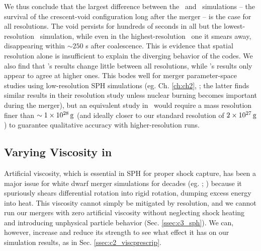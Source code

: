 
We thus conclude that the largest difference between the \gasoline\ and \arepo\ simulations -- the survival of the crescent-void configuration long after the merger -- is the case for all resolutions.  The void persists for hundreds of seconds in all but the lowest-resolution \arepo\ simulation, while even in the highest-resolution \gasoline\ one it smears away, disappearing within $\sim 250$ s after coalescence.  This is evidence that spatial resolution alone is insufficient to explain the diverging behavior of the codes.  We also find that \gasoline's results change little between all resolutions, while \arepo's results only appear to agree at higher ones.  This bodes well for merger parameter-space studies using low-resolution SPH simulations (eg. Ch. \ref{ch:ch2}, \citealt{dan+14}; the latter finds similar results in their resolution study unless nuclear burning becomes important during the merger), but an equivalent study in \arepo\ would require a mass resolution finer than $\sim1\times10^{28}\,\mathrm{g}$ (and ideally closer to our standard resolution of $2\times10^{27}\,\mathrm{g}$) to guarantee qualitative accuracy with higher-resolution runs.

\subsection{Varying Viscosity in \gasoline}
\label{ssec:c3_vary_visc}

Artificial viscosity, which is essential in SPH for proper shock capture, has been a major issue for white dwarf merger simulations for decades (eg. \citealt{guerig04}; \citeal{loreig09}) because it spuriously shears differential rotation into rigid rotation, dumping excess energy into heat.  This viscosity cannot simply be mitigated by resolution, and we cannot run our mergers with zero artificial viscosity without neglecting shock heating and introducing unphysical particle behavior (Sec. \ref{ssec:c3_sph}).  We can, however, increase and reduce its strength to see what effect it has on our simulation results, as in Sec. \ref{ssec:c2_viscprescrip}.

